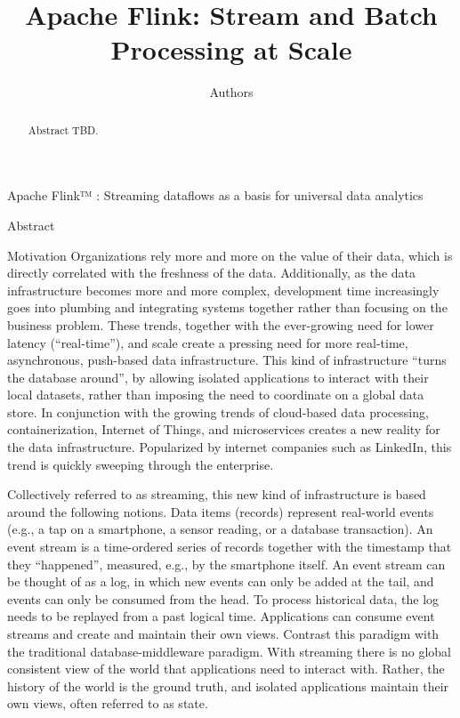 \documentclass{sig-alternate}
\begin{document}
\title{Apache Flink: Stream and Batch Processing at Scale}
\author{Authors}

\maketitle

\begin{abstract}
Abstract TBD.
\end{abstract}

Apache Flink™ : Streaming dataflows as a basis for universal data analytics

Abstract

Motivation
Organizations rely more and more on the value of their data, which is directly correlated with the freshness of the data. Additionally, as the data infrastructure becomes more and more complex, development time increasingly goes into plumbing and integrating systems together rather than focusing on the business problem. These trends, together with the ever-growing need for lower latency (“real-time”), and scale create a pressing need for more real-time, asynchronous, push-based data infrastructure. This kind of infrastructure “turns the database around”, by allowing isolated applications to interact with their local datasets, rather than imposing the need to coordinate on a global data store. In conjunction with the growing trends of cloud-based data processing, containerization, Internet of Things, and microservices creates a new reality for the data infrastructure. Popularized by internet companies such as LinkedIn, this trend is quickly sweeping through the enterprise.

Collectively referred to as streaming, this new kind of infrastructure is based around the following notions. Data items (records) represent real-world events (e.g., a tap on a smartphone, a sensor reading, or a database transaction). An event stream is a time-ordered series of records together with the timestamp that they “happened”, measured, e.g., by the smartphone itself. An event stream can be thought of as a log, in which new events can only be added at the tail, and events can only be consumed from the head. To process historical data, the log needs to be replayed from a past logical time. Applications can consume event streams and create and maintain their own views. Contrast this paradigm with the traditional database-middleware paradigm. With streaming there is no global consistent view of the world that applications need to interact with. Rather, the history of the world is the ground truth, and isolated applications maintain their own views, often referred to as state. 
\end{document}
